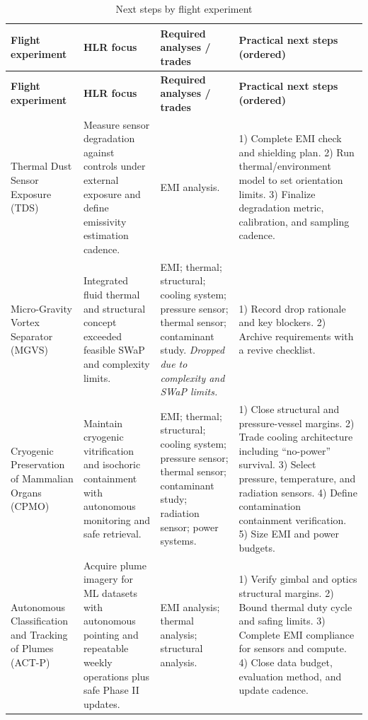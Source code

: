 \documentclass[conf]{new-aiaa}
\begin{document}
{\footnotesize
\setlength{\tabcolsep}{3pt}
\renewcommand{\arraystretch}{1.25}
\begin{longtable}{p{2.6cm} p{3.5cm} p{3.3cm} p{6.5cm}}
\caption{Next steps by flight experiment}
\label{tab:next_steps_by_experiment}\\
\toprule
\textbf{Flight experiment} & \textbf{HLR focus} & \textbf{Required analyses / trades} & \textbf{Practical next steps (ordered)} \\
\midrule
\endfirsthead
\toprule
\textbf{Flight experiment} & \textbf{HLR focus} & \textbf{Required analyses / trades} & \textbf{Practical next steps (ordered)} \\
\midrule
\endhead
\bottomrule
\endfoot

Thermal Dust Sensor Exposure (TDS) &
Measure sensor degradation against controls under external exposure and define emissivity estimation cadence. &
EMI analysis. &
1) Complete EMI check and shielding plan.
2) Run thermal/environment model to set orientation limits.
3) Finalize degradation metric, calibration, and sampling cadence. \\ \hline

Micro-Gravity Vortex Separator (MGVS) &
Integrated fluid thermal and structural concept exceeded feasible SWaP and complexity limits. &
EMI; thermal; structural; cooling system; pressure sensor; thermal sensor; contaminant study. \textit{Dropped due to complexity and SWaP limits.} &
1) Record drop rationale and key blockers.
2) Archive requirements with a revive checklist. \\ \hline

Cryogenic Preservation of Mammalian Organs (CPMO) &
Maintain cryogenic vitrification and isochoric containment with autonomous monitoring and safe retrieval. &
EMI; thermal; structural; cooling system; pressure sensor; thermal sensor; contaminant study; radiation sensor; power systems. &
1) Close structural and pressure-vessel margins.
2) Trade cooling architecture including ``no-power'' survival.
3) Select pressure, temperature, and radiation sensors.
4) Define contamination containment verification.
5) Size EMI and power budgets. \\ \hline

Autonomous Classification and Tracking of Plumes (ACT-P) &
Acquire plume imagery for ML datasets with autonomous pointing and repeatable weekly operations plus safe Phase II updates. &
EMI analysis; thermal analysis; structural analysis. &
1) Verify gimbal and optics structural margins.
2) Bound thermal duty cycle and safing limits.
3) Complete EMI compliance for sensors and compute.
4) Close data budget, evaluation method, and update cadence. \\ \hline


\end{longtable}}
\end{document}
